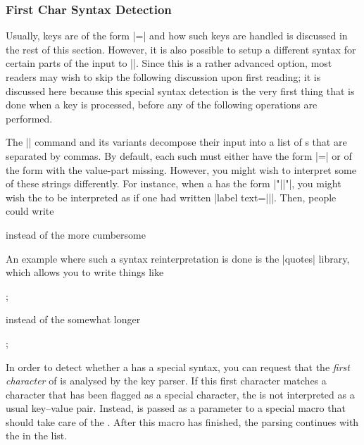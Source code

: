 \subsubsection{First Char Syntax Detection}
\label{sec:pgf:first:char:syntax}

Usually, keys are of the form |=| and how such keys are
handled is discussed in the rest of this section. However, it is also possible
to setup a different syntax for certain parts of the input to |\pgfkeys|. Since
this is a rather advanced option, most readers may wish to skip the following
discussion upon first reading; it is discussed here because this special syntax
detection is the very first thing that is done when a key is processed, before
any of the following operations are performed.

The |\pgfkeys| command and its variants decompose their input into a list of
s that are separated by commas. By default, each such
 must either have the form |=| or of the
form  with the value-part missing. However, you might wish to
interpret some of these strings differently. For instance, when a 
has the form |"||"|, you might wish the  to be
interpreted as if one had written |label text={||}|. Then, people
could write
%
\begin{codeexample}
\end{codeexample}
%
instead of the more cumbersome
%
\begin{codeexample}
\end{codeexample}
%
An example where such a syntax reinterpretation is done is the |quotes|
library, which allows you to write things like
%
\begin{codeexample}[preamble={\usetikzlibrary{graphs,quotes}}]
\tikz {};
\end{codeexample}
%
\noindent instead of the somewhat longer
%
\begin{codeexample}[preamble={\usetikzlibrary{graphs}}]
\tikz {};
\end{codeexample}

In order to detect whether a  has a special syntax, you can
request that the \emph{first character} of  is analysed by the key
parser. If this first character matches a character that has been flagged as a
special character, the  is not interpreted as a usual key--value
pair. Instead,  is passed as a parameter to a special macro that
should take care of the . After this macro has finished, the
parsing continues with the  in the list.

